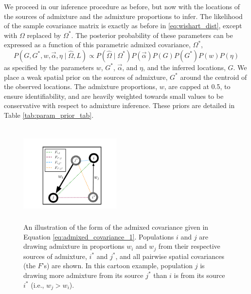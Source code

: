 \documentclass[12pt]{article}
\newcommand{\identifyadmixsource}[1]{{#1^{*}}}
\begin{document}
We proceed in our inference procedure as before, but now with the locations of the sources of admixture and the admixture proportions to infer.
The likelihood of the sample covariance matrix is exactly as before in \eqref{eq:wishart_dist},
except with $\Omega$ replaced by $\identifyadmixsource{\Omega}$.
The posterior probability of these parameters can be expressed as a function of this parametric admixed covariance, $\identifyadmixsource{\Omega}$,
\begin{equation}
\label{eq:admixed_post_prob}
P(G,\identifyadmixsource{G}, w,\vec{\alpha}, \eta \mid \widehat{\Omega}, L) 
	\propto  
		P(\widehat{\Omega}  \mid \identifyadmixsource{\Omega}) P(\vec{\alpha}) P(G) P(\identifyadmixsource{G}) P(w) P(\eta) 
\end{equation}
as specified by the parameters $w$, $\identifyadmixsource{G}$, $\vec{\alpha}$, and $\eta$, and the inferred locations, $G$.  
We place a weak spatial prior on the sources of admixture, $\identifyadmixsource{G}$ around the centroid of the observed locations. The admixture proportions, $w$, are capped at 0.5, to ensure identifiability,
and are heavily weighted towards small values to be conservative with respect to admixture inference.  
These priors are detailed in Table \ref{tab:param_prior_tab}.

\begin{figure}[htp!]
	\centering
	\includegraphics[width=2in,height=2in]{figs/admix_cov_fig.pdf}
	\caption{An illustration of the form of the admixed covariance given in Equation \eqref{eq:admixed_covariance_1}.  Populations $i$ and $j$ are drawing admixture in proportions $w_i$ and $w_j$ from their respective sources of admixture, $\identifyadmixsource{i}$ and $\identifyadmixsource{j}$, and all pairwise spatial covariances (the $F$'s) are shown.  In this cartoon example, population $j$ is drawing more admixture from its source $\identifyadmixsource{j}$ than $i$ is from its source $\identifyadmixsource{i}$ (i.e., $w_j > w_i$).
    }
\label{sfig:admixed_cov_diagram}
\end{figure}
\end{document}
